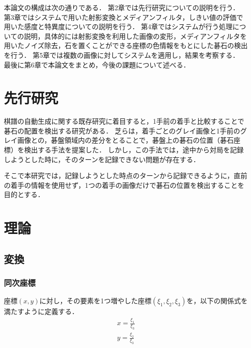 \documentclass[openright]{nitocs}
\numberwithin{equation}{section}
\begin{document}
        本論文の構成は次の通りである．
        第2章では先行研究についての説明を行う．
        第3章ではシステムで用いた射影変換とメディアンフィルタ，しきい値の評価で用いた感度と特異度についての説明を行う．
        第4章ではシステムが行う処理についての説明，具体的には射影変換を利用した画像の変形，メディアンフィルタを用いたノイズ除去，石を置くことができる座標の色情報をもとにした碁石の検出を行う．
        第5章では複数の画像に対してシステムを適用し，結果を考察する．
        最後に第6章で本論文をまとめ，今後の課題について述べる．

    \section{先行研究} %
        棋譜の自動生成に関する既存研究に着目すると，1手前の着手と比較することで碁石の配置を検出する研究がある．
        芝らは，着手ごとのグレイ画像と1手前のグレイ画像との，碁盤領域内の差分をとることで，碁盤上の碁石の位置（碁石座標）を検出する手法を提案した\cite{PilotStudy}．
        しかし，この手法では，途中から対局を記録しようとした時に，そのターンを記録できない問題が存在する．

        そこで本研究では，記録しようとした時点のターンから記録できるように，直前の着手の情報を使用せず，1つの着手の画像だけで碁石の位置を検出することを目的とする．

    \section{理論} %
    \label{config}
        \subsection{変換}
            \subsubsection{同次座標}
                座標$(x,y)$に対し，その要素を1つ増やした座標$(\xi_1,\xi_2,\xi_3)$を，以下の関係式を満たすように定義する．\\
                \begin{equation} %
                    \begin{split} %
                        x = \frac{\xi_1}{\xi_3} \\ 
                        y = \frac{\xi_2}{\xi_3}
                    \end{split}
                    \label{Homogeneous}
                \end{equation}
\end{document}

